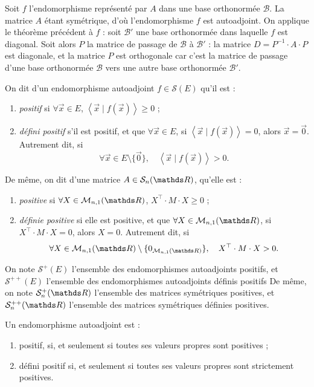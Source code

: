\begin{prv}
	Soit $f$\/ l'endomorphisme représenté par $A$\/ dans une base orthonormée $\mathcal{B}$.
	La matrice $A$\/ étant symétrique, d'où l'endomorphisme $f$\/ est autoadjoint.
	On applique le théorème précédent à $f$ : soit $\mathcal{B}'$\/ une base orthonormée dans laquelle $f$\/ est diagonal. Soit alors $P$\/ la matrice de passage de $\mathcal{B}$\/ à $\mathcal{B}'$ : la matrice $D = P^{-1} \cdot A \cdot P$\/ est diagonale, et la matrice $P$\/ est orthogonale car c'est la matrice de passage d'une base orthonormée $\mathcal{B}$\/ vers une autre base orthonormée $\mathcal{B}'$.
\end{prv}

\begin{defn}
	On dit d'un endomorphisme autoadjoint $f \in \mathcal{S}(E)$\/ qu'il est :
	\begin{enumerate}
		\item \textit{positif} si $\forall \vec{x} \in E$, $\left<\vec{x} \mid f(\vec{x}) \right> \ge 0$\/ ;
		\item \textit{défini positif} s'il est positif, et que $\forall \vec{x} \in E$, si $\left<\vec{x}  \mid f(\vec{x}) \right> = 0$, alors $\vec{x} = \vec{0}$.
			Autrement dit, si  \[
				\forall \vec{x} \in E\setminus \{\vec{0}\}, \quad\left<\vec{x}  \mid f(\vec{x}) \right> > 0
			.\]
	\end{enumerate}
	De même, on dit d'une matrice $A \in \mathcal{S}_n(\R)$, qu'elle est :
	\begin{enumerate}
		\item \textit{positive} si $\forall X \in \mathcal{M}_{n,1}(\R)$, $X^\top \cdot M \cdot X \ge 0$\/ ;
		\item \textit{définie positive} si elle est positive, et que $\forall X \in \mathcal{M}_{n,1}(\R)$, si $X^\top \cdot M\cdot X = 0$, alors $X = 0$.
			Autrement dit, si \[
				\forall X \in \mathcal{M}_{n,1}(\R) \setminus \{0_{\mathcal{M}_{n,1}(\R)}\}, \quad X^\top \cdot M \cdot X > 0
			.\]
	\end{enumerate}

	On note $\mathcal{S}^+(E)$\/ l'ensemble des endomorphismes autoadjoints positifs, et $\mathcal{S}^{++}(E)$\/ l'ensemble des endomorphismes autoadjoints définis positifs
	De même, on note $\mathcal{S}^+_n(\R)$\/ l'ensemble des matrices symétriques positives,
	et $\mathcal{S}_n^{++}(\R)$\/ l'ensemble des matrices symétriques définies positives.
\end{defn}

\begin{thm}
	Un endomorphisme autoadjoint est :
	\begin{enumerate}
		\item positif, si, et seulement si toutes ses valeurs propres sont positives ;
		\item défini positif si, et seulement si toutes ses valeurs propres sont strictement positives.
	\end{enumerate}
\end{thm}

